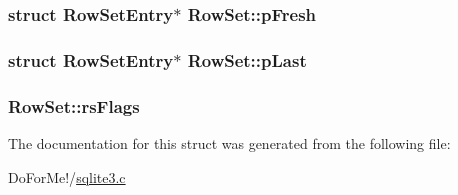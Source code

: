 \hypertarget{struct_row_set_a7c4e95bd08ff77135068bb3987be5ca1}{
\subsubsection[{p\-Fresh}]{\setlength{\rightskip}{0pt plus 5cm}struct {\bf Row\-Set\-Entry}$\ast$ Row\-Set\-::p\-Fresh}}\label{struct_row_set_a7c4e95bd08ff77135068bb3987be5ca1}
\hypertarget{struct_row_set_a040c4b798e6f20d20aa99a45e93b2079}{
\subsubsection[{p\-Last}]{\setlength{\rightskip}{0pt plus 5cm}struct {\bf Row\-Set\-Entry}$\ast$ Row\-Set\-::p\-Last}}\label{struct_row_set_a040c4b798e6f20d20aa99a45e93b2079}
\hypertarget{struct_row_set_af62438d96429ac10fcbddeb4f6bd9343}{
\subsubsection[{rs\-Flags}]{ Row\-Set\-::rs\-Flags}}\label{struct_row_set_af62438d96429ac10fcbddeb4f6bd9343}


The documentation for this struct was generated from the following file\-:\begin{DoxyCompactItemize}
\item 
Do\-For\-Me!/\hyperlink{sqlite3_8c}{sqlite3.\-c}\end{DoxyCompactItemize}
